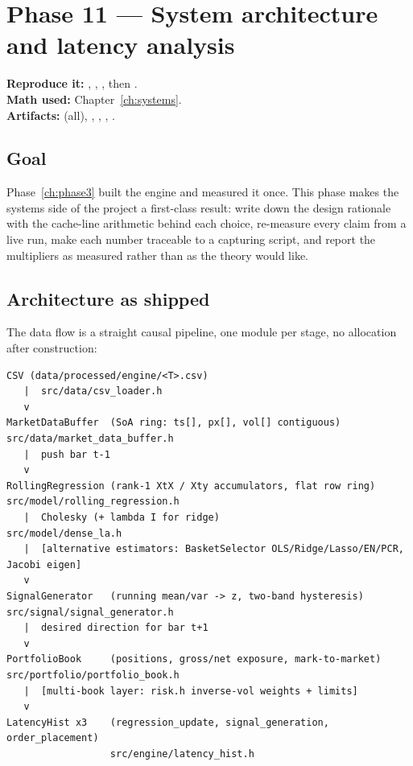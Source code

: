 \section{Phase 11 --- System architecture and latency analysis}
\label{ch:phase11}

\textbf{Reproduce it:} , ,
, then .\\
\textbf{Math used:} Chapter~\ref{ch:systems}.\\
\textbf{Artifacts:}  (all), ,
,
,
.

\subsection{Goal}

Phase~\ref{ch:phase3} built the engine and measured it once. This phase makes the systems
side of the project a first-class result: write down the design rationale with the
cache-line arithmetic behind each choice, re-measure every claim from a live run, make each
number traceable to a capturing script, and report the multipliers as measured rather than
as the theory would like.

\subsection{Architecture as shipped}
\label{sec:arch:principles}

The data flow is a straight causal pipeline, one module per stage, no allocation after
construction:

\begin{center}
\small
\begin{verbatim}
CSV (data/processed/engine/<T>.csv)
   |  src/data/csv_loader.h
   v
MarketDataBuffer  (SoA ring: ts[], px[], vol[] contiguous)     src/data/market_data_buffer.h
   |  push bar t-1
   v
RollingRegression (rank-1 XtX / Xty accumulators, flat row ring) src/model/rolling_regression.h
   |  Cholesky (+ lambda I for ridge)                            src/model/dense_la.h
   |  [alternative estimators: BasketSelector OLS/Ridge/Lasso/EN/PCR, Jacobi eigen]
   v
SignalGenerator   (running mean/var -> z, two-band hysteresis)   src/signal/signal_generator.h
   |  desired direction for bar t+1
   v
PortfolioBook     (positions, gross/net exposure, mark-to-market) src/portfolio/portfolio_book.h
   |  [multi-book layer: risk.h inverse-vol weights + limits]
   v
LatencyHist x3    (regression_update, signal_generation, order_placement)
                  src/engine/latency_hist.h
\end{verbatim}
\end{center}

